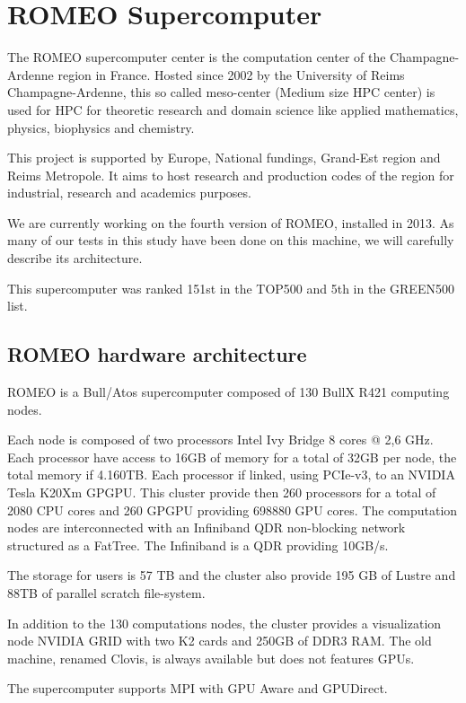 \section{ROMEO Supercomputer}
The ROMEO supercomputer center is the computation center of the Champagne-Ardenne region in France. 
Hosted since 2002 by the University of Reims Champagne-Ardenne, this so called meso-center (Medium size HPC center) is used for HPC for theoretic research and domain science like applied mathematics, physics, biophysics and chemistry. 

This project is supported by Europe, National fundings, Grand-Est region and Reims Metropole. 
It aims to host research and production codes of the region for industrial, research and academics purposes. 

We are currently working on the fourth version of ROMEO, installed in 2013. 
As many of our tests in this study have been done on this machine, we will carefully describe its architecture. 

This supercomputer was ranked 151st in the TOP500 and 5th in the GREEN500 list. 

\subsection{ROMEO hardware architecture}
\label{sec:part1_ROMEO}
ROMEO is a Bull/Atos supercomputer composed of 130 BullX R421 computing nodes. 

Each node is composed of two processors Intel Ivy Bridge 8 cores @ 2,6 GHz. 
Each processor have access to 16GB of memory for a total of 32GB per node, the total memory if 4.160TB. 
Each processor if linked, using PCIe-v3, to an NVIDIA Tesla K20Xm GPGPU. 
This cluster provide then 260 processors for a total of 2080 CPU cores and 260 GPGPU providing 698880 GPU cores. 
The computation nodes are interconnected with an Infiniband QDR non-blocking network structured as a FatTree. 
The Infiniband is a QDR providing 10GB/s. 

The storage for users is 57 TB and the cluster also provide 195 GB of Lustre and 88TB of parallel scratch file-system. 

In addition to the 130 computations nodes, the cluster provides a visualization node NVIDIA GRID with two K2 cards and 250GB of DDR3 RAM. 
The old machine, renamed Clovis, is always available but does not features GPUs. 

The supercomputer supports MPI with GPU Aware and GPUDirect. 

